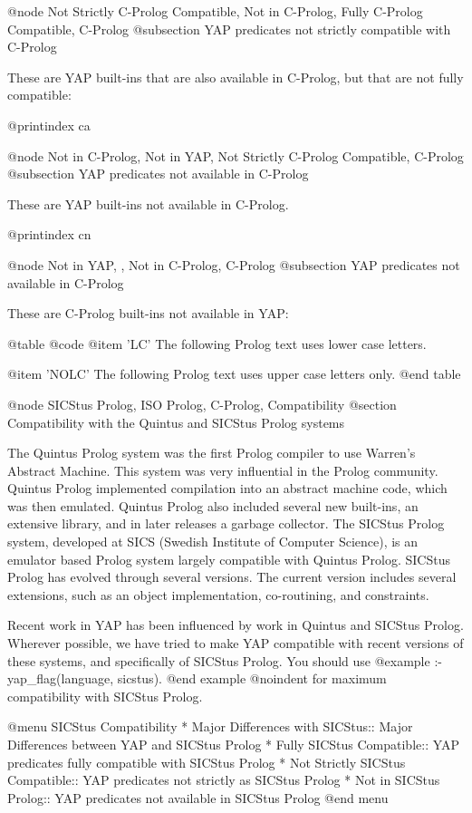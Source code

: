 {{{{{{{{@node Not Strictly C-Prolog Compatible, Not in C-Prolog, Fully C-Prolog Compatible, C-Prolog
@subsection YAP predicates not strictly compatible with C-Prolog

These are YAP built-ins that are also available in C-Prolog, but
that are not fully compatible:

@printindex ca

@node Not in C-Prolog, Not in YAP, Not Strictly C-Prolog Compatible, C-Prolog
@subsection YAP predicates not available in C-Prolog

These are YAP built-ins not available in C-Prolog.

@printindex cn

@node Not in YAP, , Not in C-Prolog, C-Prolog
@subsection YAP predicates not available in C-Prolog

These are C-Prolog built-ins not available in YAP:

@table @code
@item 'LC'
The following Prolog text uses lower case letters.

@item 'NOLC'
The following Prolog text uses upper case letters only.
@end table

@node SICStus Prolog, ISO Prolog, C-Prolog, Compatibility
@section Compatibility with the Quintus and SICStus Prolog systems

The Quintus Prolog system was the first Prolog compiler to use Warren's
Abstract Machine. This system was very influential in the Prolog
community. Quintus Prolog implemented compilation into an abstract
machine code, which was then emulated. Quintus Prolog also included
several new built-ins, an extensive library, and in later releases a
garbage collector. The SICStus Prolog system, developed at SICS (Swedish
Institute of Computer Science), is an emulator based Prolog system
largely compatible with Quintus Prolog. SICStus Prolog has evolved
through several versions. The current version includes several
extensions, such as an object implementation, co-routining, and
constraints.

Recent work in YAP has been influenced by work in Quintus and
SICStus Prolog. Wherever possible, we have tried to make YAP
compatible with recent versions of these systems, and specifically of
SICStus Prolog. You should use 
@example
:- yap_flag(language, sicstus).
@end example
@noindent
for maximum compatibility with SICStus Prolog.

@menu
SICStus Compatibility
* Major Differences with SICStus:: Major Differences between YAP and SICStus Prolog
* Fully SICStus Compatible:: YAP predicates fully compatible with
SICStus Prolog
* Not Strictly SICStus Compatible:: YAP predicates not strictly as
SICStus Prolog
* Not in SICStus Prolog:: YAP predicates not available in SICStus Prolog
@end menu

}}}}}}}}
